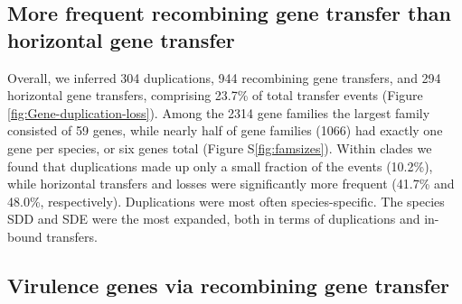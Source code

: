\documentclass[english]{article}
\begin{document}
\subsection{More frequent recombining gene transfer than horizontal gene transfer}

Overall, we inferred 304 duplications, 944 recombining gene transfers, and 294
horizontal gene transfers, comprising 23.7\% of total transfer events (Figure
\ref{fig:Gene-duplication-loss}).  Among the 2314 gene families the largest
family consisted of 59 genes, while nearly half of gene families (1066) had
exactly one gene per species, or six genes total (Figure S\ref{fig:famsizes}).
Within clades we found that duplications made up only a small fraction of the
events  (10.2\%), while horizontal transfers and losses were significantly more
frequent (41.7\% and 48.0\%, respectively). Duplications were most often
species-specific.  The species SDD and SDE were the most expanded, both in terms
of duplications and in-bound transfers.

\subsection{Virulence genes via recombining gene transfer}
\end{document}
